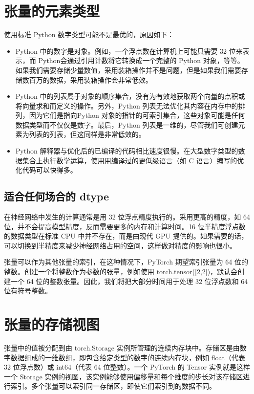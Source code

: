 \section{张量的元素类型}
使用标准 Python 数字类型可能不是最优的，原因如下：
\begin{itemize}
    \item Python 中的数字是对象。例如，一个浮点数在计算机上可能只需要 32 位来表示，而 Python会通过引用计数将它转换成一个完整的 Python 对象，等等。如果我们需要存储少量数值，采用装箱操作并不是问题，但是如果我们需要存储数百万的数据，采用装箱操作会非常低效。
    \item Python 中的列表属于对象的顺序集合，没有为有效地获取两个向量的点积或将向量求和而定义的操作。另外，Python 列表无法优化其内容在内存中的排列，因为它们是指向Python 对象的指针的可索引集合，这些对象可能是任何数据类型而不仅仅是数字。最后，Python 列表是一维的，尽管我们可创建元素为列表的列表，但这同样是非常低效的。
    \item Python 解释器与优化后的已编译的代码相比速度很慢。在大型数字类型的数据集合上执行数学运算，使用用编译过的更低级语言（如 C 语言）编写的优化代码可以快得多。
\end{itemize}
\subsection{适合任何场合的 dtype}
在神经网络中发生的计算通常是用 32 位浮点精度执行的。采用更高的精度，如 64 位，并不会提高模型精度，反而需要更多的内存和计算时间。16 位半精度浮点数的数据类型在标准 CPU 中并不存在，而是由现代 GPU 提供的。如果需要的话，可以切换到半精度来减少神经网络占用的空间，这样做对精度的影响也很小。

张量可以作为其他张量的索引，在这种情况下，PyTorch 期望索引张量为 64 位的整数。创建一个将整数作为参数的张量，例如使用 torch.tensor([2,2])，默认会创建一个 64 位的整数张量。因此，我们将把大部分时间用于处理 32 位浮点数和 64 位有符号整数。

\section{张量的存储视图}
张量中的值被分配到由 torch.Storage 实例所管理的连续内存块中。存储区是由数字数据组成的一维数组，即包含给定类型的数字的连续内存块，例如 float（代表 32 位浮点数）或 int64（代表 64 位整数）。一个 PyTorch 的 Tensor 实例就是这样一个 Storage 实例的视图，该实例能够使用偏移量和每个维度的步长对该存储区进行索引。多个张量可以索引同一存储区，即使它们索引到的数据不同。


